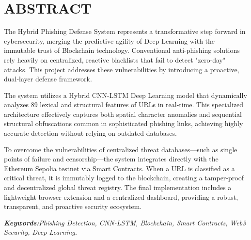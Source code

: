 
\chapter*{ABSTRACT}
The Hybrid Phishing Defense System represents a transformative step forward in cybersecurity, merging the predictive agility of Deep Learning with the immutable trust of Blockchain technology. Conventional anti-phishing solutions rely heavily on centralized, reactive blacklists that fail to detect "zero-day" attacks. This project addresses these vulnerabilities by introducing a proactive, dual-layer defense framework.

\vspace{10pt}

The system utilizes a Hybrid CNN-LSTM Deep Learning model that dynamically analyzes 89 lexical and structural features of URLs in real-time. This specialized architecture effectively captures both spatial character anomalies and sequential structural obfuscations common in sophisticated phishing links, achieving highly accurate detection without relying on outdated databases. 

\vspace{10pt}

To overcome the vulnerabilities of centralized threat databases—such as single points of failure and censorship—the system integrates directly with the Ethereum Sepolia testnet via Smart Contracts. When a URL is classified as a critical threat, it is immutably logged to the blockchain, creating a tamper-proof and decentralized global threat registry. The final implementation includes a lightweight browser extension and a centralized dashboard, providing a robust, transparent, and proactive security ecosystem.

\vspace{20pt}

\noindent\textit{{\textbf{Keywords:}}Phishing Detection, CNN-LSTM, Blockchain, Smart Contracts, Web3 Security, Deep Learning.}

\newpage
